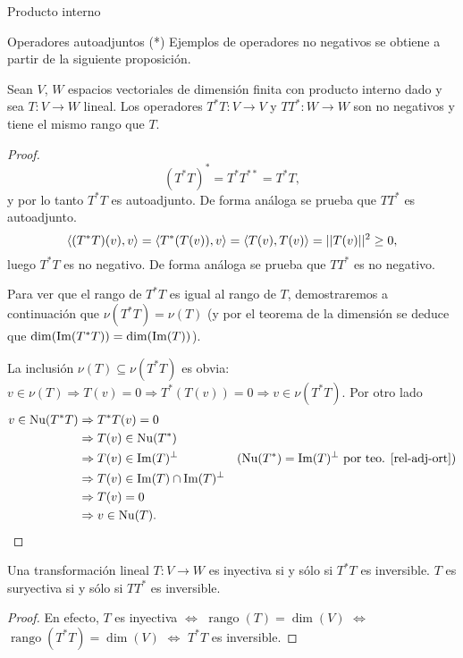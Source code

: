 \begin{chapter}{Producto interno}
\begin{section}{Operadores autoadjuntos (*)}
        Ejemplos de operadores no negativos se obtiene a partir de la siguiente proposición.
        
        \begin{proposicion}\label{prop5.26}
            Sean $V$, $W$ espacios vectoriales de dimensión finita con producto interno dado y sea $T: V \to W$ lineal. Los operadores $T^*T: V \to V$ y $TT^*: W \to W$ son  no negativos y tiene el mismo rango que $T$.
        \end{proposicion}
        \begin{proof}
            $$
            (T^*T)^* = T^* T^{**} = T^*T,
            $$
            y por lo tanto $T^*T$ es autoadjunto. De forma análoga se prueba que $TT^*$ es autoadjunto.
            $$
            \langle (T^*T)(v), v \rangle = \langle T^*(T(v)), v \rangle = \langle T(v), T(v) \rangle = ||T(v)||^2 \ge 0,  
            $$
            luego $T^*T$  es no negativo.  De forma análoga se prueba que $TT^*$ es no negativo.
            
            Para ver que el rango de $T^*T$ es igual al rango  de $T$, demostraremos a continuación que  $\nu(T^*T) = \nu(T)$ (y por el teorema de la dimensión se deduce que $\dim(\operatorname{Im}(T^*T)) = \dim(\operatorname{Im}(T))$).
            
            La inclusión $\nu(T) \subseteq \nu(T^*T)$ es obvia:  $v \in \nu(T) \Rightarrow T(v) = 0 \Rightarrow T^*(T(v)) =0 \Rightarrow v \in \nu(T^*T)$. Por otro lado
            \begin{align*}
                v \in \operatorname{Nu}(T^*T) &\Rightarrow T^*T(v) = 0& & \\
                &\Rightarrow T(v) \in \operatorname{Nu}(T^*) && \\
                &\Rightarrow T(v) \in \operatorname{Im}(T)^\perp &&\text{($\operatorname{Nu}(T^*) = \operatorname{Im}(T)^\perp$  por teo. \ref{rel-adj-ort})} \\
                &\Rightarrow T(v) \in \operatorname{Im}(T) \cap \operatorname{Im}(T)^\perp&&\\
                &\Rightarrow T(v) = 0 &&\\
                &\Rightarrow v \in \operatorname{Nu}(T). &&
            \end{align*}
        \end{proof}
        
        
        
        \begin{corolario}\label{cor5.27}
            Una transformación lineal $T: V \to W$ es inyectiva si y sólo si $T^*T$ es inversible. $T$ es suryectiva si y sólo si $TT^*$ es inversible.
        \end{corolario}
        \begin{proof}
            En  efecto, $T$ es inyectiva $\Leftrightarrow$  $\operatorname{rango}(T) = \dim(V)$ $\Leftrightarrow$  $\operatorname{rango}(T^*T) = \dim(V)$   $\Leftrightarrow$  $T^*T$  es inversible.
            

\end{proof}
\end{section}
\end{chapter}
